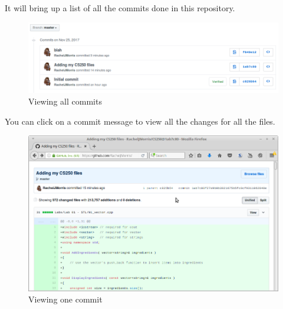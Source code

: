 \documentclass[a4paper,12pt,oneside]{book}
\begin{document}
        It will bring up a list of all the commits done in this repository.

        \begin{figure}[h]
            \centering
            \includegraphics[width=14cm]{images/github-commits2.png}
            \caption{Viewing all commits}
        \end{figure}

        You can click on a commit message to view all the changes for all
        the files.

        \begin{figure}[h]
            \centering
            \includegraphics[width=14cm]{images/github-commits3.png}
            \caption{Viewing one commit}
        \end{figure}
\end{document}
